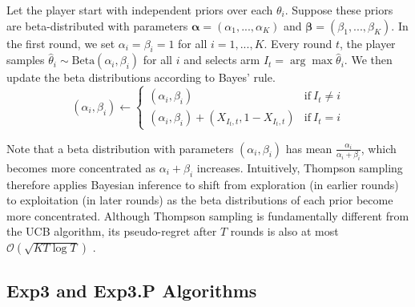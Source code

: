 \documentclass[12pt]{article}
\begin{document}
Let the player start with independent priors over each $\theta_{i}$. Suppose these priors are beta-distributed with parameters $\boldsymbol{\alpha}=(\alpha_{1}, ..., \alpha_{K})$ and $\boldsymbol{\beta}=(\beta_{1}, ..., \beta_{K})$. In the first round, we set $\alpha_{i}=\beta_{i}=1$ for all $i=1,...,K$. Every round $t$, the player samples $\hat{\theta}_{i}\sim\text{Beta}(\alpha_{i},\beta_{i})$ for all $i$ and selects arm $I_{t}=\arg\max\hat{\theta}_{i}$. We then update the beta distributions according to Bayes' rule.
\begin{equation}
(\alpha_{i}, \beta_{i})\leftarrow
\begin{cases}
(\alpha_{i},\beta_{i})&\text{if}\ I_{t}\neq i \\
(\alpha_{i},\beta_{i})+(X_{I_{t},t},1-X_{I_{t},t})&\text{if}\ I_{t}=i
\end{cases}
\end{equation}
 
Note that a beta distribution with parameters $(\alpha_{i},\beta_{i})$ has mean $\frac{\alpha_{i}}{\alpha_{i}+\beta_{i}}$, which becomes more concentrated as $\alpha_{i}+\beta_{i}$ increases. Intuitively, Thompson sampling therefore applies Bayesian inference to shift from exploration (in earlier rounds) to exploitation (in later rounds) as the beta distributions of each prior become more concentrated. Although Thompson sampling is fundamentally different from the UCB algorithm, its pseudo-regret after $T$ rounds is also at most $\mathcal{O}(\sqrt{KT\log T})$ \cite{agrawal2012}.

\subsection{Exp3 and Exp3.P Algorithms}
\end{document}
